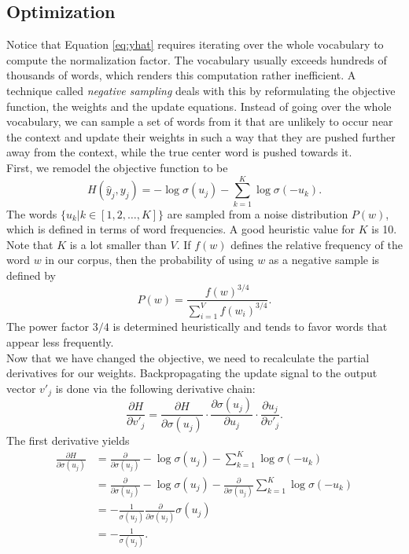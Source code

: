 \documentclass[english]{lni}
\begin{document}
\subsection{Optimization}
Notice that Equation \ref{eq:yhat} requires iterating over the whole vocabulary to compute the normalization factor.
The vocabulary usually exceeds hundreds of thousands of words, which renders this computation rather inefficient.
A technique called \textit{negative sampling} deals with this by reformulating the objective function, the weights and the update equations.
Instead of going over the whole vocabulary, we can sample a set of words from it that are unlikely to occur near the context and update their 
weights in such a way that they are pushed further away from the context, while the true center word is pushed towards it.\\
First, we remodel the objective function to be 
\begin{equation}
    H(\hat{y}_{j}, y_{j}) = -\log{\sigma(u_{j})} - \sum_{k = 1}^{K}{\log{\sigma(-u_{k})}}.
\end{equation}
The words $\{u_{k}|k \in [1, 2,\hdots,K]\}$ are sampled from a noise distribution $P(w)$, which is defined in terms of word frequencies.
A good heuristic value for $K$ is 10. Note that $K$ is a lot smaller than $V$.
If $f(w)$ defines the relative frequency of the word $w$ in our corpus, then the probability of using $w$ as a negative sample is defined by
\begin{equation}
    P(w) = \frac{{f(w)}^{3/4}}{\sum_{i = 1}^{V}{{f(w_{i})}^{3/4}}}.
\end{equation}
The power factor $3/4$ is determined heuristically and tends to favor words that appear less frequently.\\
Now that we have changed the objective, we need to recalculate the partial derivatives for our weights.
Backpropagating the update signal to the output vector $v'_{j}$ is done via the following derivative chain:
\begin{equation}
    \frac{\partial H}{\partial v'_{j}} = \frac{\partial H}{\partial \sigma(u_{j})} \cdot \frac{\partial \sigma(u_{j})}{\partial u_{j}} \cdot \frac{\partial u_{j}}{\partial v'_{j}}.
\end{equation}
The first derivative yields
\begin{align}
    \frac{\partial H}{\partial \sigma(u_{j})} &= \frac{\partial}{\partial \sigma(u_{j})}-\log{\sigma(u_{j})} - \sum_{k = 1}^{K}{\log{\sigma(-u_{k})}} \nonumber \\ 
    &= \frac{\partial}{\partial \sigma(u_{j})}-\log{\sigma(u_{j})} - \frac{\partial}{\partial \sigma(u_{j})} \sum_{k = 1}^{K}{\log{\sigma(-u_{k})}} \nonumber \\
    &= -\frac{1}{\sigma(u_{j})} \frac{\partial}{\partial \sigma(u_{j})} \sigma(u_{j}) \nonumber \\ 
    &= -\frac{1}{\sigma(u_{j})}.
\end{align}
\end{document}
